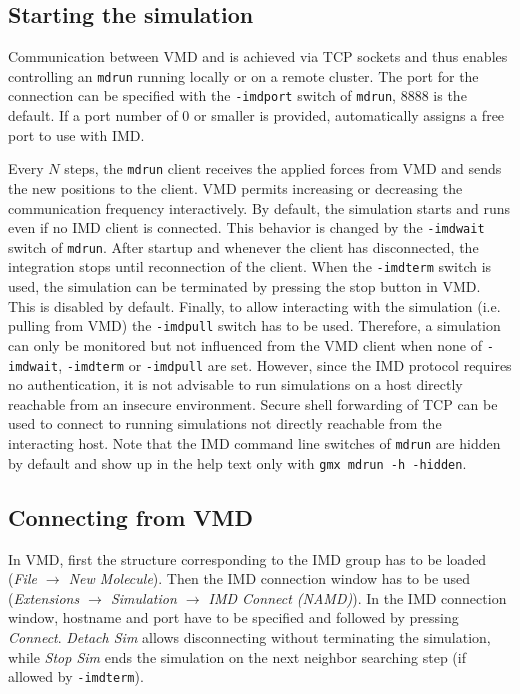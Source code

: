 \subsection{Starting the simulation}
Communication between VMD and {\gromacs} is achieved via TCP sockets and thus enables
controlling an {\tt mdrun} running locally or on a remote cluster. The port for the
connection can be specified with the {\tt -imdport} switch of {\tt mdrun}, 8888 is
the default. If a port number of 0 or smaller is provided, {\gromacs} automatically
assigns a free port to use with IMD.

Every $N$ steps, the {\tt mdrun} client receives the applied forces from VMD and sends the new
positions to the client. VMD permits increasing or decreasing the communication frequency
interactively.
By default, the simulation starts and runs even if no IMD client is connected. This
behavior is changed by the {\tt -imdwait} switch of {\tt mdrun}. After startup and
whenever the client has disconnected, the integration stops until reconnection of
the client.
When the {\tt -imdterm} switch is used, the simulation can be terminated by pressing
the stop button in VMD. This is disabled by default.
Finally, to allow interacting with the simulation (i.e. pulling from VMD) the {\tt -imdpull}
switch has to be used.
Therefore, a simulation can only be monitored but not influenced from the VMD client
when none of {\tt -imdwait}, {\tt -imdterm} or {\tt -imdpull} are set. However, since
the IMD protocol requires no authentication, it is not advisable to run simulations on
a host directly reachable from an insecure environment. Secure shell forwarding of TCP
can be used to connect to running simulations not directly reachable from the interacting host.
Note that the IMD command line switches of {\tt mdrun} are hidden by default and show
up in the help text only with {\tt gmx mdrun -h -hidden}.

\subsection{Connecting from VMD}
In VMD, first the structure corresponding to the IMD group has to be loaded ({\it File
$\rightarrow$ New Molecule}). Then the IMD connection window has to be used
({\it Extensions $\rightarrow$ Simulation $\rightarrow$ IMD Connect (NAMD)}). In the IMD
connection window, hostname and port have to be specified and followed by pressing
{\it Connect}. {\it Detach Sim} allows disconnecting without terminating the simulation, while
{\it Stop Sim} ends the simulation on the next neighbor searching step (if allowed by
{\tt -imdterm}).

